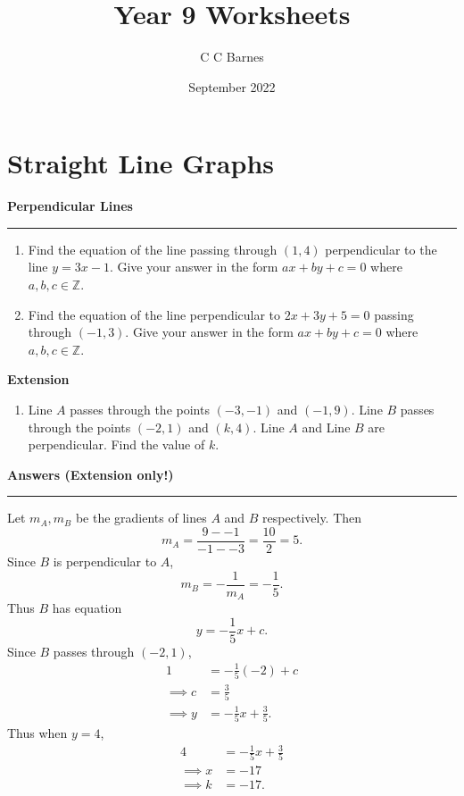 \documentclass[]{article}
\title{Year 9 Worksheets}
\author{C C Barnes }
\date{September 2022}
\begin{document}
\maketitle
\begin{abstract}
    
\end{abstract}

\newpage
\section{Straight Line Graphs}

\newpage

\noindent \textbf{Perpendicular Lines}

\medskip

\hrule

\medskip

\begin{enumerate}
    \item Find the equation of the line passing through \((1,4)\) perpendicular to the line \(y=3x-1\). Give your answer in the form \(ax+by+c=0\) where \(a,b,c \in \mathbb{Z}\).
    \item Find the equation of the line perpendicular to \(2x+3y+5=0\) passing through \((-1,3)\). Give your answer in the form \(ax+by+c=0\) where \(a,b,c \in \mathbb{Z}\).
\end{enumerate}

\noindent \textbf{Extension}

\begin{enumerate}
    \item Line \(A\) passes through the points \((-3, -1)\) and \((-1, 9)\). Line \(B\) passes through the points \((-2, 1)\) and \((k, 4)\). Line \(A\) and Line \(B\) are perpendicular. Find the value of \(k\). 
\end{enumerate}

\newpage

\noindent \textbf{Answers (Extension only!)}

\medskip

\hrule

\medskip

\noindent Let \(m_A, m_B\) be the gradients of lines \(A\) and \(B\) respectively. Then
\[
m_A = \frac{9--1}{-1--3} = \frac{10}{2} = 5.
\]
Since \(B\) is perpendicular to \(A\),
\[
m_B = - \frac{1}{m_A} = -\frac{1}{5}.
\]
Thus \(B\) has equation
\[
y=-\frac{1}{5}x + c.
\]
Since \(B\) passes through \((-2,1)\),
\begin{align*}
    1 &= -\frac{1}{5}(-2) + c \\
    \implies  c &= \frac{3}{5} \\
    \implies y &= -\frac{1}{5}x + \frac{3}{5}.
\end{align*}
Thus when \(y=4\),
\begin{align*}
    4 &= -\frac{1}{5}x + \frac{3}{5} \\
    \implies x &= -17 \\
    \implies k &= -17.
\end{align*}
\end{document}

